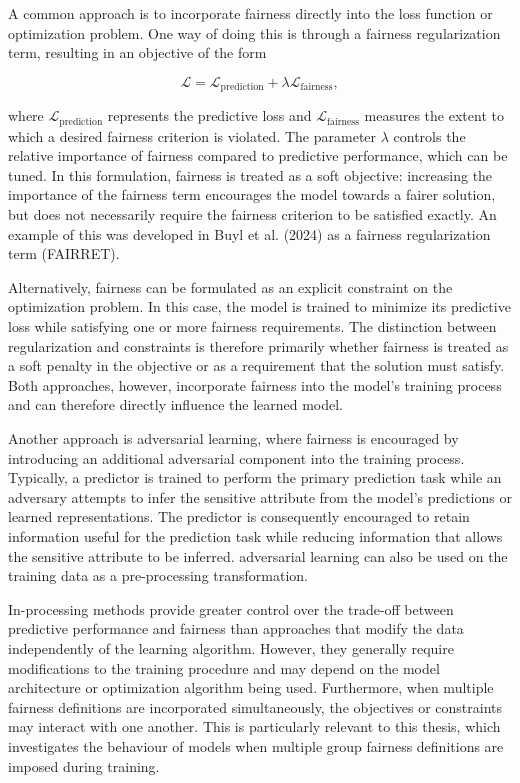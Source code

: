 A common approach is to incorporate fairness directly into the loss function or optimization problem. One way of doing this is through a fairness regularization term, resulting in an objective of the form

\[
\mathcal{L} =
\mathcal{L}_{\mathrm{prediction}} +
\lambda \mathcal{L}_{\mathrm{fairness}},
\]

where $\mathcal{L}_{\mathrm{prediction}}$ represents the predictive loss and $\mathcal{L}_{\mathrm{fairness}}$ measures the extent to which a desired fairness criterion is violated. The parameter $\lambda$ controls the relative importance of fairness compared to predictive performance, which can be tuned. In this formulation, fairness is treated as a soft objective: increasing the importance of the fairness term encourages the model towards a fairer solution, but does not necessarily require the fairness criterion to be satisfied exactly. An example of this was developed in Buyl et al. (2024) \cite{fairret} as a fairness regularization term (FAIRRET).

Alternatively, fairness can be formulated as an explicit constraint on the optimization problem. In this case, the model is trained to minimize its predictive loss while satisfying one or more fairness requirements. The distinction between regularization and constraints is therefore primarily whether fairness is treated as a soft penalty in the objective or as a requirement that the solution must satisfy. Both approaches, however, incorporate fairness into the model's training process and can therefore directly influence the learned model.

Another approach is adversarial learning, where fairness is encouraged by introducing an additional adversarial component into the training process. Typically, a predictor is trained to perform the primary prediction task while an adversary attempts to infer the sensitive attribute from the model's predictions or learned representations. The predictor is consequently encouraged to retain information useful for the prediction task while reducing information that allows the sensitive attribute to be inferred. adversarial learning can also be used on the training data as a pre-processing transformation.

In-processing methods provide greater control over the trade-off between predictive performance and fairness than approaches that modify the data independently of the learning algorithm. However, they generally require modifications to the training procedure and may depend on the model architecture or optimization algorithm being used. Furthermore, when multiple fairness definitions are incorporated simultaneously, the objectives or constraints may interact with one another. This is particularly relevant to this thesis, which investigates the behaviour of models when multiple group fairness definitions are imposed during training.

